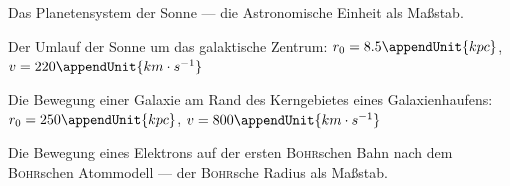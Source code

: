 \documentclass{atistandalonetask}
\begin{document}
\begin{atiTask}[
    title = Expandieren die Maßstäbe?
  ]
\begin{atiSubtasks}
{        \begin{atiSubsubtasks}
          \item{
            Das Planetensystem der Sonne --- die Astronomische Einheit als Maßstab.
          }
          \item{
            Der Umlauf der Sonne um das galaktische Zentrum: $r_0=8.5\appendUnit{kpc}$, $v=220\appendUnit{km\cdot s^{-1}}$
          }
          \item{
            Die Bewegung einer Galaxie am Rand des Kerngebietes eines Galaxienhaufens: $r_0 = 250\appendUnit{kpc}$, $v = 800\appendUnit{km\cdot s^{-1}}$
          }
          \item{
            Die Bewegung eines Elektrons auf der ersten \textsc{Bohr}schen Bahn nach dem \textsc{Bohr}schen Atommodell --- der \textsc{Bohr}sche Radius als Maßstab.
          }
        \end{atiSubsubtasks}
      }
    \end{atiSubtasks}
  \end{atiTask}
\end{document}
